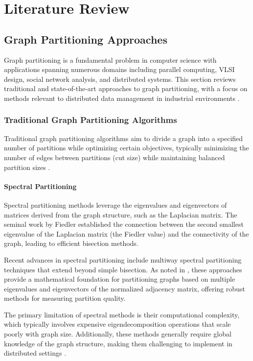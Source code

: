 \chapter{Literature Review}

\section{Graph Partitioning Approaches}
Graph partitioning is a fundamental problem in computer science with applications spanning numerous domains including parallel computing, VLSI design, social network analysis, and distributed systems. This section reviews traditional and state-of-the-art approaches to graph partitioning, with a focus on methods relevant to distributed data management in industrial environments \cite{distributed2023}.

\subsection{Traditional Graph Partitioning Algorithms}
Traditional graph partitioning algorithms aim to divide a graph into a specified number of partitions while optimizing certain objectives, typically minimizing the number of edges between partitions (cut size) while maintaining balanced partition sizes \cite{optimization2023}.

\subsubsection{Spectral Partitioning}
Spectral partitioning methods leverage the eigenvalues and eigenvectors of matrices derived from the graph structure, such as the Laplacian matrix. The seminal work by Fiedler \cite{fiedler1973algebraic} established the connection between the second smallest eigenvalue of the Laplacian matrix (the Fiedler value) and the connectivity of the graph, leading to efficient bisection methods.

Recent advances in spectral partitioning include multiway spectral partitioning techniques that extend beyond simple bisection. As noted in \cite{spectral2023}, these approaches provide a mathematical foundation for partitioning graphs based on multiple eigenvalues and eigenvectors of the normalized adjacency matrix, offering robust methods for measuring partition quality.

The primary limitation of spectral methods is their computational complexity, which typically involves expensive eigendecomposition operations that scale poorly with graph size. Additionally, these methods generally require global knowledge of the graph structure, making them challenging to implement in distributed settings \cite{technical2023}.

